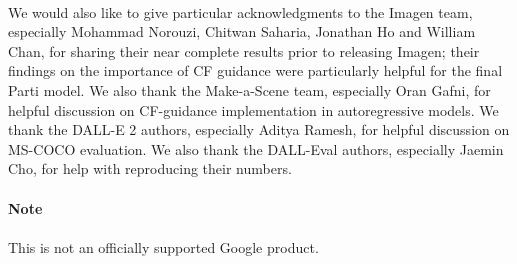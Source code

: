 \documentclass{article}
\begin{document}
\\
We would also like to give particular acknowledgments to the Imagen team, especially Mohammad Norouzi, Chitwan Saharia, Jonathan Ho and William Chan, for sharing their near complete results prior to releasing Imagen; their findings on the importance of CF guidance were particularly helpful for the final Parti model. We also thank the Make-a-Scene team, especially Oran Gafni, for helpful discussion on CF-guidance implementation in autoregressive models. We thank the DALL-E 2 authors, especially Aditya Ramesh, for helpful discussion on MS-COCO evaluation. We also thank the DALL-Eval authors, especially Jaemin Cho, for help with reproducing their numbers.\\
\\
{\noindent \LARGE \textbf{Note}}\\\\
This is not an officially supported Google product.\\
\end{document}

